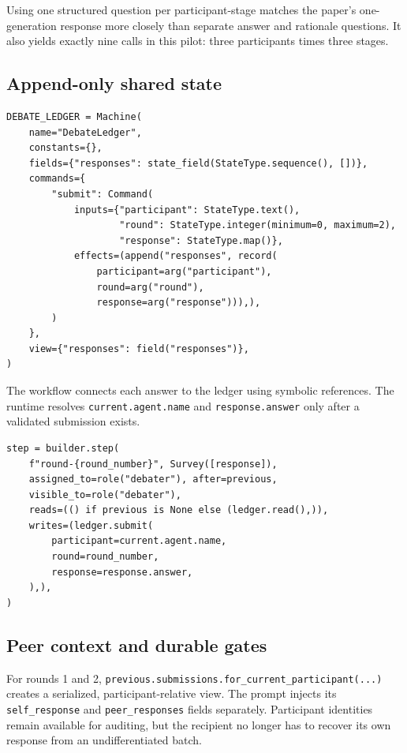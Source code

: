 \documentclass[10pt]{article}
\newcommand{\code}[1]{\texttt{#1}}
\begin{document}
Using one structured question per participant-stage matches the paper's one-generation response
more closely than separate answer and rationale questions. It also yields exactly nine calls in this
pilot: three participants times three stages.

\subsection{Append-only shared state}

\begin{lstlisting}[style=edsl]
DEBATE_LEDGER = Machine(
    name="DebateLedger",
    constants={},
    fields={"responses": state_field(StateType.sequence(), [])},
    commands={
        "submit": Command(
            inputs={"participant": StateType.text(),
                    "round": StateType.integer(minimum=0, maximum=2),
                    "response": StateType.map()},
            effects=(append("responses", record(
                participant=arg("participant"),
                round=arg("round"),
                response=arg("response"))),),
        )
    },
    view={"responses": field("responses")},
)
\end{lstlisting}

The workflow connects each answer to the ledger using symbolic references. The runtime resolves
\code{current.agent.name} and \code{response.answer} only after a validated submission exists.

\begin{lstlisting}[style=edsl]
step = builder.step(
    f"round-{round_number}", Survey([response]),
    assigned_to=role("debater"), after=previous,
    visible_to=role("debater"),
    reads=(() if previous is None else (ledger.read(),)),
    writes=(ledger.submit(
        participant=current.agent.name,
        round=round_number,
        response=response.answer,
    ),),
)
\end{lstlisting}

\subsection{Peer context and durable gates}

For rounds 1 and 2, \code{previous.submissions.for\_current\_participant(...)} creates a
serialized, participant-relative view. The prompt injects its \code{self\_response} and
\code{peer\_responses} fields separately. Participant identities remain available for auditing,
but the recipient no longer has to recover its own response from an undifferentiated batch.
\end{document}
